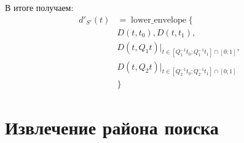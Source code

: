 В итоге получаем:
\begin{equation}
\begin{aligned}
d'_{S'}(t) &= \mathop{lower\_envelope}\{\\
&D(t, t_0), D(t, t_1),\\
&D(t, Q_1t)|_{t \in [Q_1^{-1}t_0; Q_1^{-1}t_1] \cap [0; 1]},\\
&D(t, Q_2t)|_{t \in [Q_2^{-1}t_0; Q_2^{-1}t_1] \cap [0; 1]}\\
&\}
\end{aligned}
\end{equation}

\section{Извлечение района поиска}
